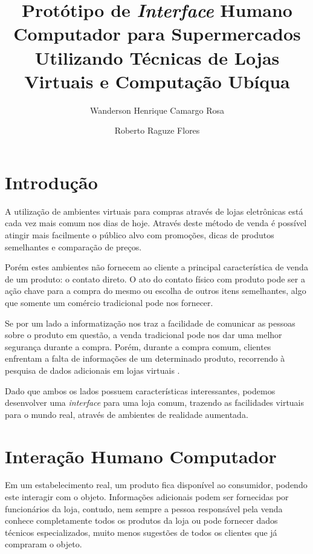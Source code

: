 \documentclass{article}
\title{Protótipo de \emph{Interface} Humano Computador para Supermercados
Utilizando Técnicas de Lojas Virtuais e Computação Ubíqua}
\author{Wanderson Henrique Camargo Rosa\inst{1} \and Roberto Raguze
Flores\inst{1}}
\begin{document}
\maketitle{}

\section{Introdução}
\label{sec:introducao}


A utilização de ambientes virtuais para compras através de lojas eletrônicas
está cada vez mais comum nos dias de hoje. Através deste método de venda é
possível atingir mais facilmente o público alvo com promoções, dicas de produtos
semelhantes e comparação de preços.


Porém estes ambientes não fornecem ao cliente a principal característica de
venda de um produto: o contato direto. O ato do contato físico com produto pode
ser a ação chave para a compra do mesmo ou escolha de outros itens semelhantes,
algo que somente um comércio tradicional pode nos fornecer.

Se por um lado a informatização nos traz a facilidade de comunicar as pessoas
sobre o produto em questão, a venda tradicional pode nos dar uma melhor
segurança durante a compra. Porém, durante a compra comum, clientes enfrentam a
falta de informações de um determinado produto, recorrendo à pesquisa de dados
adicionais em lojas virtuais \cite{vonreischach2009}.


Dado que ambos os lados possuem características interessantes, podemos
desenvolver uma \emph{interface} para uma loja comum, trazendo as facilidades
virtuais para o mundo real, através de ambientes de realidade aumentada.

\section{Interação Humano Computador}
\label{sec:ihc}


Em um estabelecimento real, um produto fica disponível ao consumidor, podendo
este interagir com o objeto. Informações adicionais podem ser fornecidas por
funcionários da loja, contudo, nem sempre a pessoa responsável pela venda
conhece completamente todos os produtos da loja ou pode fornecer dados técnicos
especializados, muito menos sugestões de todos os clientes que já compraram o
objeto.
\end{document}
